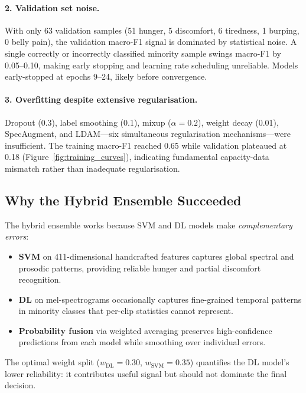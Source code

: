 \documentclass[11pt,a4paper]{article}
\begin{document}
\paragraph{2. Validation set noise.}
With only 63 validation samples (51 hunger, 5 discomfort, 6 tiredness,
1 burping, 0 belly pain), the validation macro-F1 signal is dominated
by statistical noise. A single correctly or incorrectly classified
minority sample swings macro-F1 by 0.05--0.10, making early stopping
and learning rate scheduling unreliable. Models early-stopped at
epochs 9--24, likely before convergence.

\paragraph{3. Overfitting despite extensive regularisation.}
Dropout (0.3), label smoothing (0.1), mixup ($\alpha = 0.2$), weight
decay (0.01), SpecAugment, and LDAM---six simultaneous regularisation
mechanisms---were insufficient. The training macro-F1 reached 0.65
while validation plateaued at 0.18 (Figure~\ref{fig:training_curves}),
indicating fundamental capacity-data mismatch rather than inadequate
regularisation.

\subsection{Why the Hybrid Ensemble Succeeded}

The hybrid ensemble works because SVM and DL models make
\textit{complementary errors}:
\begin{itemize}[nosep]
  \item \textbf{SVM} on 411-dimensional handcrafted features captures
        global spectral and prosodic patterns, providing reliable hunger
        and partial discomfort recognition.
  \item \textbf{DL} on mel-spectrograms occasionally captures
        fine-grained temporal patterns in minority classes that
        per-clip statistics cannot represent.
  \item \textbf{Probability fusion} via weighted averaging preserves
        high-confidence predictions from each model while smoothing
        over individual errors.
\end{itemize}

The optimal weight split ($w_{\text{DL}} = 0.30$,
$w_{\text{SVM}} = 0.35$) quantifies the DL model's lower reliability:
it contributes useful signal but should not dominate the final decision.
\end{document}
